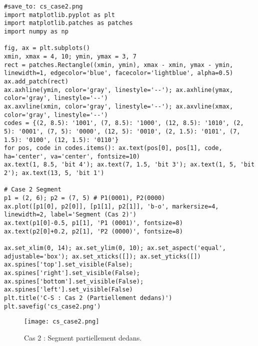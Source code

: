 \documentclass{article}
\begin{document}
\begin{verbatim}
#save_to: cs_case2.png
import matplotlib.pyplot as plt
import matplotlib.patches as patches
import numpy as np

fig, ax = plt.subplots()
xmin, xmax = 4, 10; ymin, ymax = 3, 7
rect = patches.Rectangle((xmin, ymin), xmax - xmin, ymax - ymin, linewidth=1, edgecolor='blue', facecolor='lightblue', alpha=0.5)
ax.add_patch(rect)
ax.axhline(ymin, color='gray', linestyle='--'); ax.axhline(ymax, color='gray', linestyle='--')
ax.axvline(xmin, color='gray', linestyle='--'); ax.axvline(xmax, color='gray', linestyle='--')
codes = {(2, 8.5): '1001', (7, 8.5): '1000', (12, 8.5): '1010', (2, 5): '0001', (7, 5): '0000', (12, 5): '0010', (2, 1.5): '0101', (7, 1.5): '0100', (12, 1.5): '0110'}
for pos, code in codes.items(): ax.text(pos[0], pos[1], code, ha='center', va='center', fontsize=10)
ax.text(1, 8.5, 'bit 4'); ax.text(7, 1.5, 'bit 3'); ax.text(1, 5, 'bit 2'); ax.text(13, 5, 'bit 1')

# Case 2 Segment
p1 = (2, 6); p2 = (7, 5) # P1(0001), P2(0000)
ax.plot([p1[0], p2[0]], [p1[1], p2[1]], 'b-o', markersize=4, linewidth=2, label='Segment (Cas 2)')
ax.text(p1[0]-0.5, p1[1], 'P1 (0001)', fontsize=8)
ax.text(p2[0]+0.2, p2[1], 'P2 (0000)', fontsize=8)

ax.set_xlim(0, 14); ax.set_ylim(0, 10); ax.set_aspect('equal', adjustable='box'); ax.set_xticks([]); ax.set_yticks([])
ax.spines['top'].set_visible(False); ax.spines['right'].set_visible(False); ax.spines['bottom'].set_visible(False); ax.spines['left'].set_visible(False)
plt.title('C-S : Cas 2 (Partiellement dedans)')
plt.savefig('cs_case2.png')
\end{verbatim}
\begin{figure}[H] \centering \texttt{[image: cs\_case2.png]} \caption{Cas 2 : Segment partiellement dedans.} \label{fig:cs_case2} \end{figure}
\end{document}
